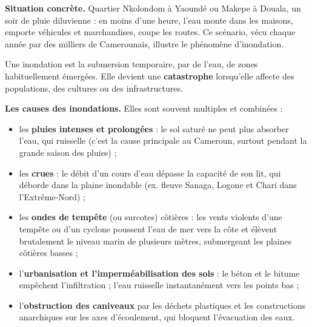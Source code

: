 \documentclass[11pt]{article}
\newcommand{\cle}[1]{{\popxbold\color{popdark}#1}}
\newcounter{popsec}
\newcounter{popsub}
\newcommand{\courssub}[1]{%
  \stepcounter{popsub}%
  \par\vspace{9pt}\noindent{\popxbold\fontsize{11.5}{13}\selectfont\color{popink}{\color{poporange}\thepopsec.\thepopsub}\hspace{6pt}#1}\par\nopagebreak\vspace{4pt}
}
\begin{document}
\courssub{Les inondations}

\textbf{Situation concrète.} Quartier Nkolondom à Yaoundé ou Makepe à Douala, un soir de pluie diluvienne : en moins d'une heure, l'eau monte dans les maisons, emporte véhicules et marchandises, coupe les routes. Ce scénario, vécu chaque année par des milliers de Camerounais, illustre le phénomène d'\cle{inondation}.

\begin{definition}[Inondation]
Une \cle{inondation} est la submersion temporaire, par de l'eau, de zones habituellement émergées. Elle devient une \textbf{catastrophe} lorsqu'elle affecte des populations, des cultures ou des infrastructures.
\end{definition}

\textbf{Les causes des inondations.} Elles sont souvent multiples et combinées :

\begin{itemize}
\item les \textbf{pluies intenses et prolongées} : le sol saturé ne peut plus absorber l'eau, qui ruisselle (c'est la cause principale au Cameroun, surtout pendant la grande saison des pluies) ;
\item les \textbf{crues} : le débit d'un cours d'eau dépasse la capacité de son lit, qui déborde dans la plaine inondable (ex. fleuve Sanaga, Logone et Chari dans l'Extrême-Nord) ;
\item les \textbf{ondes de tempête} (ou \cle{surcotes}) côtières : les vents violents d'une tempête ou d'un cyclone poussent l'eau de mer vers la côte et élèvent brutalement le niveau marin de plusieurs mètres, submergeant les plaines côtières basses ;
\item l'\textbf{urbanisation et l'imperméabilisation des sols} : le béton et le bitume empêchent l'infiltration ; l'eau ruisselle instantanément vers les points bas ;
\item l'\textbf{obstruction des caniveaux} par les déchets plastiques et les constructions anarchiques sur les axes d'écoulement, qui bloquent l'évacuation des eaux.
\end{itemize}
\end{document}

